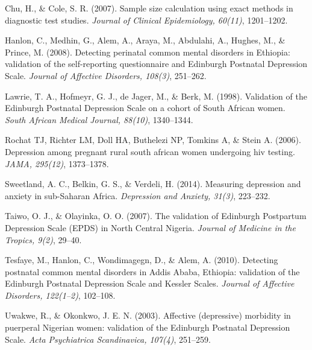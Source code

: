 \documentclass[man,natbib,longtable]{apa6}\usepackage[]{graphicx}\usepackage[]{color}
\begin{document}
{\vspace{0.25cm}

Chu, H., \& Cole, S. R. (2007). Sample size calculation using exact methods in diagnostic test studies. \textit{Journal of Clinical Epidemiology, 60(11)}, 1201--1202.

\vspace{0.25cm}

Hanlon, C., Medhin, G., Alem, A., Araya, M., Abdulahi, A., Hughes, M., \& Prince, M. (2008). Detecting perinatal common mental disorders in Ethiopia: validation of the self-reporting questionnaire and Edinburgh Postnatal Depression Scale. \textit{Journal of Affective Disorders, 108(3)}, 251--262.

\vspace{0.25cm}

Lawrie, T. A., Hofmeyr, G. J., de Jager, M., \& Berk, M. (1998). Validation of the Edinburgh Postnatal Depression Scale on a cohort of South African women. \textit{South African Medical Journal, 88(10)}, 1340--1344.

\vspace{0.25cm}

Rochat TJ, Richter LM, Doll HA, Buthelezi NP, Tomkins A, \& Stein A. (2006). Depression among pregnant rural south african women undergoing hiv testing. \textit{JAMA, 295(12)}, 1373--1378.

\vspace{0.25cm}

Sweetland, A. C., Belkin, G. S., \& Verdeli, H. (2014). Measuring depression and anxiety in sub-Saharan Africa. \textit{Depression and Anxiety, 31(3)}, 223--232.

\vspace{0.25cm}

Taiwo, O. J., \& Olayinka, O. O. (2007). The validation of Edinburgh Postpartum Depression Scale (EPDS) in North Central Nigeria. \textit{Journal of Medicine in the Tropics, 9(2)}, 29--40.

\vspace{0.25cm}

Tesfaye, M., Hanlon, C., Wondimagegn, D., \& Alem, A. (2010). Detecting postnatal common mental disorders in Addis Ababa, Ethiopia: validation of the Edinburgh Postnatal Depression Scale and Kessler Scales. \textit{Journal of Affective Disorders, 122(1–2)}, 102--108.

\vspace{0.25cm}

Uwakwe, R., \& Okonkwo, J. E. N. (2003). Affective (depressive) morbidity in puerperal Nigerian women: validation of the Edinburgh Postnatal Depression Scale. \textit{Acta Psychiatrica Scandinavica, 107(4)}, 251--259.

}
\end{document}
